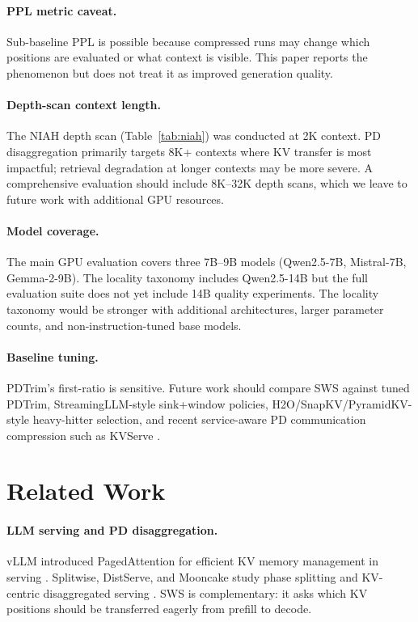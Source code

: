 \documentclass[11pt]{article}
\newcommand{\method}{SWS}
\theoremstyle{definition}
\theoremstyle{plain}
\begin{document}
\paragraph{PPL metric caveat.}
Sub-baseline PPL is possible because compressed runs may change which positions are evaluated or what context is visible.  This paper reports the phenomenon but does not treat it as improved generation quality.

\paragraph{Depth-scan context length.}
The NIAH depth scan (Table~\ref{tab:niah}) was conducted at 2K context.  PD disaggregation primarily targets 8K+ contexts where KV transfer is most impactful; retrieval degradation at longer contexts may be more severe.  A comprehensive evaluation should include 8K--32K depth scans, which we leave to future work with additional GPU resources.

\paragraph{Model coverage.}
The main GPU evaluation covers three 7B--9B models (Qwen2.5-7B, Mistral-7B, Gemma-2-9B).  The locality taxonomy includes Qwen2.5-14B but the full evaluation suite does not yet include 14B quality experiments.  The locality taxonomy would be stronger with additional architectures, larger parameter counts, and non-instruction-tuned base models.

\paragraph{Baseline tuning.}
PDTrim's first-ratio is sensitive.  Future work should compare \method{} against tuned PDTrim, StreamingLLM-style sink+window policies, H2O/SnapKV/PyramidKV-style heavy-hitter selection, and recent service-aware PD communication compression such as KVServe \citep{kvserve}.

\section{Related Work}
\label{sec:related}

\paragraph{LLM serving and PD disaggregation.}
vLLM introduced PagedAttention for efficient KV memory management in serving \citep{vllm}.  Splitwise, DistServe, and Mooncake study phase splitting and KV-centric disaggregated serving \citep{splitwise,distserve,mooncake}.  \method{} is complementary: it asks which KV positions should be transferred eagerly from prefill to decode.
\end{document}

